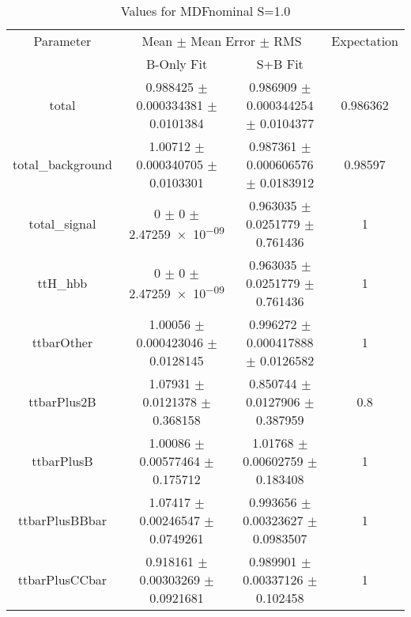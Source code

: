 \begin{table}
\centering
\caption{Values for MDFnominal S=1.0}
\begin{tabular}{cccc}
\toprule
Parameter & \multicolumn{2}{c}{Mean $\pm$ Mean Error $\pm$ RMS} & Expectation\\
 & B-Only Fit & S+B Fit & \\
\midrule
total & \num{0.988425} $\pm$ \num{0.000334381} $\pm$ \num{0.0101384} & \num{0.986909} $\pm$ \num{0.000344254} $\pm$ \num{0.0104377} & \num{0.986362}\\
total\_background & \num{1.00712} $\pm$ \num{0.000340705} $\pm$ \num{0.0103301} & \num{0.987361} $\pm$ \num{0.000606576} $\pm$ \num{0.0183912} & \num{0.98597}\\
total\_signal & \num{0} $\pm$ \num{0} $\pm$ \num{2.47259e-09} & \num{0.963035} $\pm$ \num{0.0251779} $\pm$ \num{0.761436} & \num{1}\\
ttH\_hbb & \num{0} $\pm$ \num{0} $\pm$ \num{2.47259e-09} & \num{0.963035} $\pm$ \num{0.0251779} $\pm$ \num{0.761436} & \num{1}\\
ttbarOther & \num{1.00056} $\pm$ \num{0.000423046} $\pm$ \num{0.0128145} & \num{0.996272} $\pm$ \num{0.000417888} $\pm$ \num{0.0126582} & \num{1}\\
ttbarPlus2B & \num{1.07931} $\pm$ \num{0.0121378} $\pm$ \num{0.368158} & \num{0.850744} $\pm$ \num{0.0127906} $\pm$ \num{0.387959} & \num{0.8}\\
ttbarPlusB & \num{1.00086} $\pm$ \num{0.00577464} $\pm$ \num{0.175712} & \num{1.01768} $\pm$ \num{0.00602759} $\pm$ \num{0.183408} & \num{1}\\
ttbarPlusBBbar & \num{1.07417} $\pm$ \num{0.00246547} $\pm$ \num{0.0749261} & \num{0.993656} $\pm$ \num{0.00323627} $\pm$ \num{0.0983507} & \num{1}\\
ttbarPlusCCbar & \num{0.918161} $\pm$ \num{0.00303269} $\pm$ \num{0.0921681} & \num{0.989901} $\pm$ \num{0.00337126} $\pm$ \num{0.102458} & \num{1}\\
\bottomrule
\end{tabular}
\end{table}